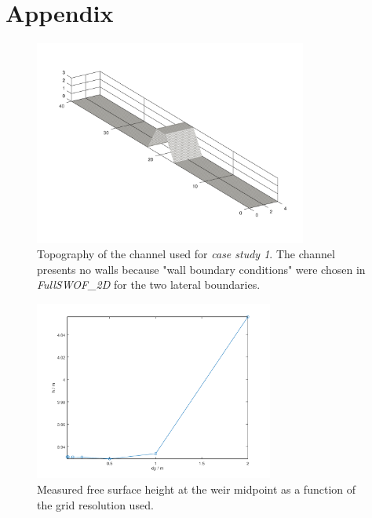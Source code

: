 \chapter{Appendix}



\begin{figure}[H]
  \centering
  \includegraphics[width=0.8\textwidth]{Figures/channel.png}
  \caption{Topography of the channel used for \emph{case study 1}. The channel presents no walls because "wall boundary conditions" were chosen in \textit{FullSWOF\_2D} for the two lateral boundaries.}
  \label{fig:channel}
\end{figure}


\begin{figure}[H]
  \centering
  \includegraphics[width=0.7\textwidth]{Figures/convergence_center.png}
  \caption{Measured free surface height at the weir midpoint as a function of the grid resolution used.}
  \label{fig:convergence_center}
\end{figure}


